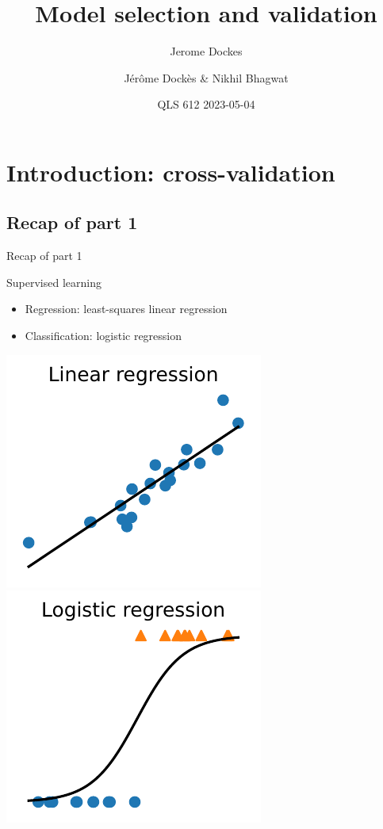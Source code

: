 \documentclass[presentation,mathserif,table]{beamer}
\author{Jerome Dockes}
\date{}
\title{Model selection and validation}
\author{Jérôme Dockès \& Nikhil Bhagwat}
\date{QLS 612 2023-05-04}
\begin{document}
\maketitle
\section{Introduction: cross-validation}
\label{sec:orgfaee4a9}
\subsection{Recap of part 1}
\label{sec:orga8d0ea3}
\begin{frame}[label={sec:orgb83bc1d}]{Recap of part 1}
\begin{block}{Supervised learning}
\begin{itemize}
\item Regression: least-squares linear regression
\item Classification: logistic regression
\end{itemize}
\includegraphics[height=.4 \textheight]{figures/generated/linear_regression_1d/linear_regression.pdf}
\includegraphics[height=.4 \textheight]{figures/generated/logistic_regression_1d/logistic_regression.pdf}
\end{block}
\end{frame}
\end{document}
